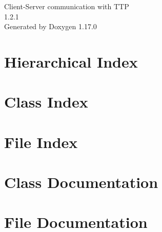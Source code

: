 \documentclass[twoside]{book}
\newcommand{\+}{\discretionary{\mbox{\scriptsize$\hookleftarrow$}}{}{}}
\newcommand{\clearemptydoublepage}{%
    \newpage{\pagestyle{empty}\cleardoublepage}%
  }
\begin{document}
  \raggedbottom
  \begin{titlepage}
  \vspace*{7cm}
  \begin{center}%
  {\Large Client-\/\+Server communication with TTP}\\
  [1ex]\large 1.\+2.\+1 \\
  \vspace*{1cm}
  {\large Generated by Doxygen 1.17.0}\\
  \end{center}
  \end{titlepage}
  \clearemptydoublepage
  \tableofcontents
  \clearemptydoublepage

\chapter{Hierarchical Index}

\chapter{Class Index}

\chapter{File Index}

\chapter{Class Documentation}




\chapter{File Documentation}



  \backmatter
  \newpage
  \clearemptydoublepage
  \printindex
\end{document}
